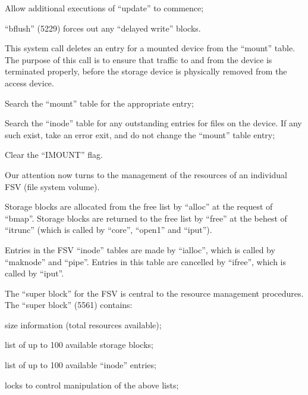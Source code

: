 \item[7229:] Allow  additional  executions  of
      ``update'' to commence;

\item[7230:] ``bflush'' (5229)  forces  out  any
      ``delayed write'' blocks.
\ed


This system call deletes an entry for a
mounted  device from the ``mount'' table.
The purpose of this call is  to  ensure
that  traffic to and from the device is
terminated properly, before the storage
device  is  physically removed from the
access device.

\bd
\item[6154:] Search the ``mount'' table for  the
      appropriate entry;

\item[6161:] Search the ``inode'' table for  any
      outstanding  entries for files on
      the device. If  any  such  exist,
      take  an  error  exit, and do not
      change the ``mount'' table entry;

\item[6168:] Clear the ``IMOUNT'' flag.
\ed



Our attention now turns to the  management  of the resources of an individual
FSV (file system volume).


Storage blocks are allocated  from  the
free  list by ``alloc'' at the request of
``bmap''.  Storage blocks are returned to
the  free  list by ``free'' at the behest
of ``itrunc'' (which is called by ``core'',
``open1'' and ``iput'').


Entries in the FSV ``inode''  tables  are
made  by  ``ialloc'',  which is called by
``maknode'' and ``pipe''. Entries  in  this
table  are  cancelled by ``ifree'', which
is called by ``iput''.


The ``super block'' for the FSV  is  central  to  the  resource management procedures.  The ``super block'' (5561) contains:

\bi
\item size  information (total resources available);

\item list of up to 100  available  storage blocks;

\item list of up to 100  available  ``inode'' entries;

\item locks to control manipulation of  the above lists;

